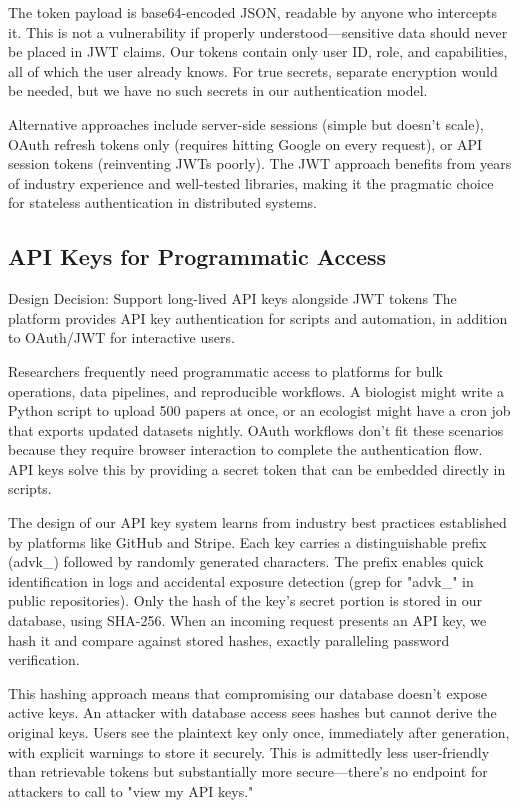 \documentclass[12pt,a4paper]{article}
\begin{document}
The token payload is base64-encoded JSON, readable by anyone who intercepts it. This is not a vulnerability if properly understood—sensitive data should never be placed in JWT claims. Our tokens contain only user ID, role, and capabilities, all of which the user already knows. For true secrets, separate encryption would be needed, but we have no such secrets in our authentication model.

Alternative approaches include server-side sessions (simple but doesn't scale), OAuth refresh tokens only (requires hitting Google on every request), or API session tokens (reinventing JWTs poorly). The JWT approach benefits from years of industry experience and well-tested libraries, making it the pragmatic choice for stateless authentication in distributed systems.

\subsection{API Keys for Programmatic Access}

\begin{rationale}{Design Decision: Support long-lived API keys alongside JWT tokens}
The platform provides API key authentication for scripts and automation, in addition to OAuth/JWT for interactive users.
\end{rationale}

Researchers frequently need programmatic access to platforms for bulk operations, data pipelines, and reproducible workflows. A biologist might write a Python script to upload 500 papers at once, or an ecologist might have a cron job that exports updated datasets nightly. OAuth workflows don't fit these scenarios because they require browser interaction to complete the authentication flow. API keys solve this by providing a secret token that can be embedded directly in scripts.

The design of our API key system learns from industry best practices established by platforms like GitHub and Stripe. Each key carries a distinguishable prefix (advk\_) followed by randomly generated characters. The prefix enables quick identification in logs and accidental exposure detection (grep for "advk\_" in public repositories). Only the hash of the key's secret portion is stored in our database, using SHA-256. When an incoming request presents an API key, we hash it and compare against stored hashes, exactly paralleling password verification.

This hashing approach means that compromising our database doesn't expose active keys. An attacker with database access sees hashes but cannot derive the original keys. Users see the plaintext key only once, immediately after generation, with explicit warnings to store it securely. This is admittedly less user-friendly than retrievable tokens but substantially more secure—there's no endpoint for attackers to call to "view my API keys."
\end{document}
